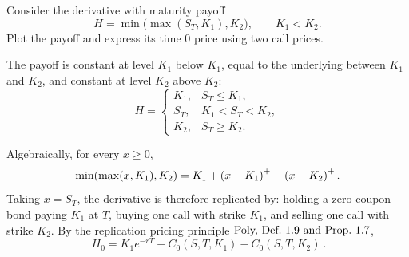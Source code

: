 \begin{exercise}
Consider the derivative with maturity payoff
\[
  H=\min\bigl(\max(S_T,K_1),K_2\bigr),\qquad K_1<K_2.
\]
Plot the payoff and express its time \(0\) price using two call prices.
\end{exercise}

\begin{solution}
The payoff is constant at level \(K_1\) below \(K_1\), equal to the underlying
between \(K_1\) and \(K_2\), and constant at level \(K_2\) above \(K_2\):
\[
  H =
  \begin{cases}
    K_1, & S_T\le K_1,\\
    S_T, & K_1<S_T<K_2,\\
    K_2, & S_T\ge K_2.
  \end{cases}
\]

\begin{center}
\end{center}

Algebraically, for every \(x\ge0\),
\[
  \min(\max(x,K_1),K_2)
  =
  K_1+\left(x-K_1\right)^+-\left(x-K_2\right)^+.
\]
Taking \(x=S_T\), the derivative is therefore replicated by:
holding a zero-coupon bond paying \(K_1\) at \(T\), buying one call with
strike \(K_1\), and selling one call with strike \(K_2\).  By the replication
pricing principle \(\textup{Poly, Def.~1.9 and Prop.~1.7}\),
\[
  \boxed{\ 
  H_0=K_1e^{-rT}+C_0(S,T,K_1)-C_0(S,T,K_2)
  \ }.
\]
\end{solution}
